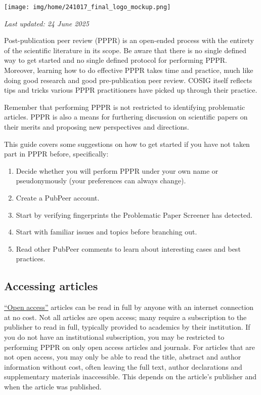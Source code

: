 \documentclass[letterpaper, 12pt]{article}
\begin{document}
\flushleft\texttt{[image: img/home/241017\_final\_logo\_mockup.png]}

\textit{Last updated: 24 June 2025}

Post-publication peer review (PPPR) is an open-ended process with the entirety of the scientific literature in its scope. Be aware that there is no single defined way to get started and no single defined protocol for performing PPPR. Moreover, learning how to do effective PPPR takes time and practice, much like doing good research and good pre-publication peer review. COSIG itself reflects tips and tricks various PPPR practitioners have picked up through their practice.

Remember that performing PPPR is not restricted to identifying problematic articles. PPPR is also a means for furthering discussion on scientific papers on their merits and proposing new perspectives and directions.

This guide covers some suggestions on how to get started if you have not taken part in PPPR before, specifically:

\begin{enumerate}
    \setlength\itemsep{-0.5em}
    \item Decide whether you will perform PPPR under your own name or pseudonymously (your preferences can always change).
    \item Create a PubPeer account.
    \item Start by verifying fingerprints the Problematic Paper Screener has detected.
    \item Start with familiar issues and topics before branching out.
    \item Read other PubPeer comments to learn about interesting cases and best practices.
\end{enumerate}

\subsection*{Accessing articles}

\href{https://en.wikipedia.org/wiki/Open_access}{``Open access''} articles can be read in full by anyone with an internet connection at no cost. Not all articles are open access; many require a subscription to the publisher to read in full, typically provided to academics by their institution. If you do not have an institutional subscription, you may be restricted to performing PPPR on only open access articles and journals. For articles that are not open access, you may only be able to read the title, abstract and author information without cost, often leaving the full text, author declarations and supplementary materials inaccessible. This depends on the article's publisher and when the article was published.
 
\end{document}
